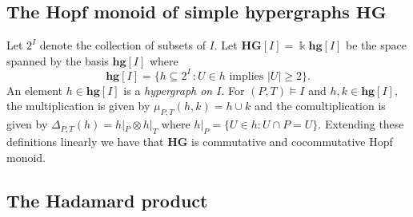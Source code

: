\documentclass[10pt]{amsart}
\theoremstyle{definition}
\newtheorem{rema}[theorem]{Remark}
\def\field{\Bbbk}
\newcommand{\bH}{\mathbf{H}}
\newcommand{\bPi}{\bpi}
\newcommand{\bG}{\mathbf{G}}
\newcommand{\bpi}{\boldsymbol \pi}
\begin{document}
\subsection{The Hopf monoid of simple hypergraphs \texorpdfstring{$\mathbf{HG}$}{HG}}\label{ss:hypergraph}

Let $2^I$ denote the collection of subsets of $I$. Let $\mathbf{HG} [I]=\field {\mathbf{hg}} [I]$ be the space spanned by the basis $\mathbf{hg} [I]$ where
 $$\mathbf{hg}[I]=\big\{h \subseteq 2^I\,: U\in h\text{ implies }|U|\ge 2\big\}.$$
An element $h\in\mathbf{hg}[I]$ is a \emph{hypergraph on $I$}.
For $(P,T)\models I$ and $h,k\in \mathbf{hg}[I]$, the multiplication is given by $\mu_{P,T}(h,k)=h\cup k$ and the comultiplication 
is given by $\Delta_{P,T}(h) = h |_P\otimes h |_T$ where $h |_P=\{U\in h : U\cap P = U\}$. Extending these definitions linearly we have that $\mathbf{HG}$ is 
commutative and cocommutative Hopf monoid. 

%

\subsection{The Hadamard product}\label{ss:hadamard}
\end{document}

